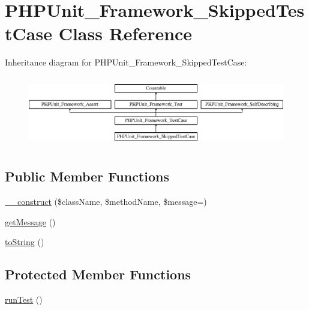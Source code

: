 \hypertarget{class_p_h_p_unit___framework___skipped_test_case}{}\section{P\+H\+P\+Unit\+\_\+\+Framework\+\_\+\+Skipped\+Test\+Case Class Reference}
\label{class_p_h_p_unit___framework___skipped_test_case}
Inheritance diagram for P\+H\+P\+Unit\+\_\+\+Framework\+\_\+\+Skipped\+Test\+Case\+:\begin{figure}[H]
\begin{center}
\leavevmode
\includegraphics[height=3.111111cm]{class_p_h_p_unit___framework___skipped_test_case}
\end{center}
\end{figure}
\subsection*{Public Member Functions}
\begin{DoxyCompactItemize}
\item 
\mbox{\hyperlink{class_p_h_p_unit___framework___skipped_test_case_afe6b924c0b9ead28b232f6860fc50236}{\+\_\+\+\_\+construct}} (\$class\+Name, \$method\+Name, \$message=\textquotesingle{}\textquotesingle{})
\item 
\mbox{\hyperlink{class_p_h_p_unit___framework___skipped_test_case_a0b0e611236742aac18ba1936d03ba89a}{get\+Message}} ()
\item 
\mbox{\hyperlink{class_p_h_p_unit___framework___skipped_test_case_a5558c5d549f41597377fa1ea8a1cefa3}{to\+String}} ()
\end{DoxyCompactItemize}
\subsection*{Protected Member Functions}
\begin{DoxyCompactItemize}
\item 
\mbox{\hyperlink{class_p_h_p_unit___framework___skipped_test_case_ad2541a093be4d619db04ed65d661a684}{run\+Test}} ()
\end{DoxyCompactItemize}

